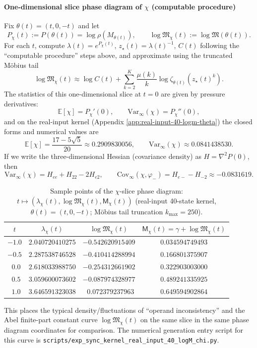 \paragraph{One-dimensional slice phase diagram of \texorpdfstring{$\chi$}{chi} (computable procedure)}
Fix
\(
\theta(t)=(t,0,-t)
\)
and let
\[
P_\chi(t):=P(\theta(t))=\log\rho(M_{\theta(t)}),
\qquad
\log\mathfrak{M}_\chi(t):=\log\mathfrak{M}(\theta(t)).
\]
For each $t$, compute $\lambda(t)=e^{P_\chi(t)}$, $z_\star(t)=\lambda(t)^{-1}$, $C(t)$ following the ``computable procedure'' steps above, and approximate using the truncated M\"{o}bius tail
\[
\log\mathfrak{M}_\chi(t)\approx \log C(t)+\sum_{k=2}^{K}\frac{\mu(k)}{k}\log\zeta_{\theta(t)}(z_\star(t)^k).
\]
The statistics of this one-dimensional slice at $t=0$ are given by pressure derivatives:
\[
\mathbb{E}[\chi]=P_\chi'(0),\qquad \mathrm{Var}_\infty(\chi)=P_\chi''(0),
\]
and on the real-input kernel (Appendix \ref{app:real-input-40-logm-theta}) the closed forms and numerical values are
\[
\mathbb{E}[\chi]=\frac{17-5\sqrt5}{20}\approx 0.2909830056,
\qquad
\mathrm{Var}_\infty(\chi)\approx 0.0841438530.
\]
If we write the three-dimensional Hessian (covariance density) as $H=\nabla^2P(0)$, then
\[
\mathrm{Var}_\infty(\chi)=H_{ee}+H_{22}-2H_{e2},
\qquad
\mathrm{Cov}_\infty(\chi,\varphi_-)=H_{e-}-H_{-2}\approx -0.0831619.
\]
\begin{table}[H]
\centering
\scriptsize
\setlength{\tabcolsep}{8pt}
\renewcommand{\arraystretch}{1.15}
\caption{Sample points of the $\chi$-slice phase diagram: $t\mapsto(\lambda_\chi(t),\log\mathfrak{M}_\chi(t),\mathsf{M}_\chi(t))$ (real-input 40-state kernel, $\theta(t)=(t,0,-t)$; M\"{o}bius tail truncation $k_{\max}=250$).}
\label{tab:real-input-40-logM-chi-sample}
\begin{tabular}{@{}cccc@{}}
\toprule
$t$ & $\lambda_\chi(t)$ & $\log\mathfrak{M}_\chi(t)$ & $\mathsf{M}_\chi(t)=\gamma+\log\mathfrak{M}_\chi(t)$ \\
\midrule
$-1.0$ & $2.040720410275$ & $-0.542620915409$ & $0.034594749493$ \\
$-0.5$ & $2.287538746528$ & $-0.410414288994$ & $0.166801375907$ \\
$\ \ 0.0$ & $2.618033988750$ & $-0.254312661902$ & $0.322903003000$ \\
$\ \ 0.5$ & $3.059600073602$ & $-0.087974328977$ & $0.489241335925$ \\
$\ \ 1.0$ & $3.646591323038$ & $\ \ 0.072379237963$ & $0.649594902864$ \\
\bottomrule
\end{tabular}
\end{table}

This places the typical density/fluctuations of ``operand inconsistency'' and the Abel finite-part constant curve $\log\mathfrak{M}_\chi(t)$ on the same slice in the same phase diagram coordinates for comparison. The numerical generation entry script for this curve is
\texttt{scripts/exp\_sync\_kernel\_real\_input\_40\_logM\_chi.py}.

